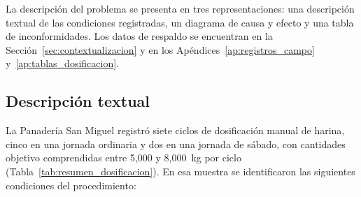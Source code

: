 La descripción del problema se presenta en tres representaciones: una
descripción textual de las condiciones registradas, un diagrama de causa y
efecto y una tabla de inconformidades. Los datos de respaldo se encuentran
en la Sección~\ref{sec:contextualizacion} y en los
Apéndices~\ref{ap:registros_campo} y~\ref{ap:tablas_dosificacion}.

\subsection{Descripción textual}
\label{subsec:descripcion_textual}


La Panadería San Miguel registró siete ciclos de dosificación manual de
harina, cinco en una jornada ordinaria y dos en una jornada de sábado, con
cantidades objetivo comprendidas entre 5,000 y 8,000~kg por ciclo
(Tabla~\ref{tab:resumen_dosificacion}). En esa muestra se identificaron las
siguientes condiciones del procedimiento:


